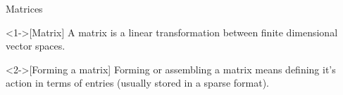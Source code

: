 \begin{frame}{Matrices}
  \begin{definition}<1->[Matrix]
    A \alert{matrix} is a linear transformation between finite dimensional vector spaces.
  \end{definition}
  \begin{definition}<2->[Forming a matrix]
    \alert{Forming} or \alert{assembling} a matrix means defining it's action in terms of entries (usually stored in a sparse format).
  \end{definition}
\end{frame}

